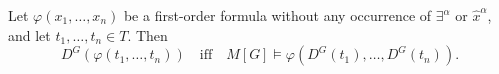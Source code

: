 Let $\varphi(x_1, \ldots, x_n)$ be a first-order formula without any occurrence of $\exists^\alpha$ or $\hat{x}^\alpha$, and let $t_1, \ldots, t_n \in T$. Then
$$D^G(\varphi(t_1, \ldots, t_n)) \quad \text{iff} \quad M[G] \models \varphi(D^G(t_1), \ldots, D^G(t_n)).$$
